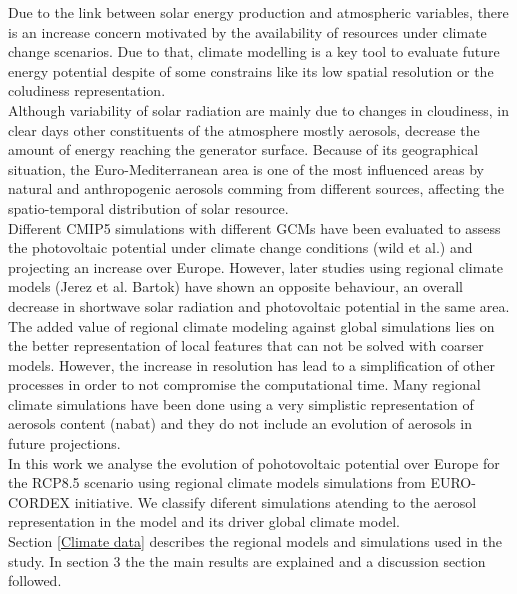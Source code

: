   Due to the link between solar energy production and atmospheric variables, there is an increase concern motivated by the availability of resources under climate change scenarios. Due to that, climate modelling is a key tool to evaluate future energy potential despite of some constrains like its low spatial resolution or the coludiness representation.\\
  
   Although variability of solar radiation are mainly due to changes in cloudiness, in clear days other constituents of the atmosphere mostly aerosols, decrease the amount of energy reaching the generator surface. Because of its geographical situation, the Euro-Mediterranean area is one of the most influenced areas by natural and anthropogenic aerosols comming from different sources, affecting the spatio-temporal distribution of solar resource.\\

   Different CMIP5 simulations with different GCMs have been evaluated to assess the photovoltaic potential under climate change conditions (wild et al.) and projecting an increase over Europe. However, later studies using regional climate models (Jerez et al. Bartok) have shown an opposite behaviour, an overall decrease in shortwave solar radiation and photovoltaic potential in the same area.\\

   The added value of regional climate modeling against global simulations lies on the better representation of local features that can not be solved with coarser models. However, the increase in resolution has lead to a simplification of other processes in order to not compromise the computational time. Many regional climate simulations have been done using a very simplistic representation of aerosols content (nabat) and they do not include an evolution of aerosols in future projections.\\
   
   In this work we analyse the evolution of pohotovoltaic potential over Europe for the RCP8.5 scenario using regional climate models simulations from EURO-CORDEX initiative. We classify diferent simulations atending to the aerosol representation in the model and its driver global climate model.\\

   Section \ref{Climate data} describes the regional models and simulations used in the study. In section 3 the the main results are explained and a discussion section followed.\\

